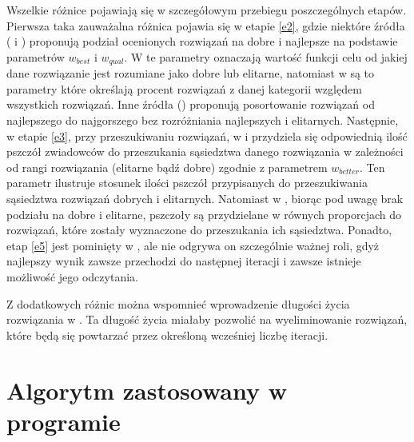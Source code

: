Wszelkie różnice pojawiają się w szczegółowym przebiegu poszczególnych etapów. Pierwsza taka zauważalna różnica pojawia się w etapie \ref{e2}, gdzie niektóre źródła (\cite{algroj} i \cite{algroj3}) proponują podział ocenionych rozwiązań na dobre i najlepsze na podstawie parametrów $w_{best}$ i $w_{qual}$. W \cite{algroj} te parametry oznaczają wartość funkcji celu od jakiej dane rozwiązanie jest rozumiane jako dobre lub elitarne, natomiast w \cite{algroj3} są to parametry które określają procent rozwiązań z danej kategorii względem wszystkich rozwiązań. Inne źródła (\cite{algroj2}) proponują posortowanie rozwiązań od najlepszego do najgorszego bez rozróżniania najlepszych i elitarnych. Następnie, w etapie \ref{e3}, przy przeszukiwaniu rozwiązań, w \cite{algroj} i \cite{algroj3} przydziela się odpowiednią ilość pszczół zwiadowców do przeszukania sąsiedztwa danego rozwiązania w zależności od rangi rozwiązania (elitarne bądź dobre) zgodnie z parametrem $w_{better}$. Ten parametr ilustruje stosunek ilości pszczół przypisanych do przeszukiwania sąsiedztwa rozwiązań dobrych i elitarnych. Natomiast w \cite{algroj2}, biorąc pod uwagę brak podziału na dobre i elitarne, pszczoły są przydzielane w równych proporcjach do rozwiązań, które zostały wyznaczone do przeszukania ich sąsiedztwa. Ponadto, etap \ref{e5} jest pominięty w \cite{algroj}, ale nie odgrywa on szczególnie ważnej roli, gdyż najlepszy wynik zawsze przechodzi do następnej iteracji i zawsze istnieje możliwość jego odczytania.

Z dodatkowych różnic można wspomnieć wprowadzenie długości życia rozwiązania w \cite{algroj3}. Ta długość życia miałaby pozwolić na wyeliminowanie rozwiązań, które będą się powtarzać przez określoną wcześniej liczbę iteracji.  


\section{Algorytm zastosowany w programie}

